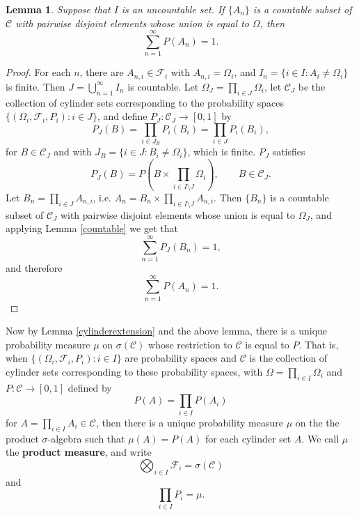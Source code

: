 \documentclass{article}
\newtheorem{lemma}[theorem]{Lemma}
\theoremstyle{definition}
\begin{document}
\begin{lemma}
Suppose that $I$ is an uncountable set. 
If $\{A_n\}$ is a countable subset of $\mathscr{C}$ with pairwise disjoint elements whose union is equal to $\Omega$, then
\[
\sum_{n=1}^\infty P(A_n)=1.
\]
\end{lemma}
\begin{proof}
For each $n$,
there are $A_{n,i} \in \mathscr{F}_i$ with $A_{n,i} = \Omega_i$, and
$I_n = \{i \in I: A_i \neq \Omega_i\}$ is finite. 
Then $J=\bigcup_{n=1}^\infty I_n$ is countable. Let $\Omega_J=\prod_{i \in J} \Omega_i$, let
$\mathscr{C}_J$ be the collection of cylinder sets corresponding to the probability
spaces $\{(\Omega_i,\mathscr{F}_i,P_i): i \in J\}$, and define $P_J:\mathscr{C}_J \to [0,1]$ by 
\[
P_J(B) = \prod_{i \in J_B} P_i(B_i) = \prod_{i \in J} P_i(B_i),
\]
for $B \in \mathscr{C}_J$ and with $J_B=\{i \in J: B_i \neq \Omega_i\}$, which is finite. $P_J$ satisfies
\[
P_J(B) = P\left(B \times \prod_{i \in I \setminus J} \Omega_i \right), \qquad B \in \mathscr{C}_J. 
\]
Let $B_n=\prod_{i \in J} A_{n,i}$,
i.e. $A_n = B_n \times \prod_{i \in I \setminus J} A_{n,i}$. 
 Then $\{B_n\}$ is a countable subset of $\mathscr{C}_J$ with pairwise disjoint elements whose
union is equal to $\Omega_J$, and
applying Lemma \ref{countable} we get that 
\[
\sum_{n=1}^\infty P_J(B_n)=1,
\]
and therefore
\[
\sum_{n=1}^\infty P(A_n) = 1.
\]
\end{proof}

Now by Lemma \ref{cylinderextension} and the above lemma, there is a unique probability measure $\mu$ on
$\sigma(\mathscr{C})$ whose restriction to $\mathscr{C}$ is equal to $P$. That is, 
when $\{(\Omega_i,\mathscr{F}_i,P_i): i \in I\}$ are probability spaces and
$\mathscr{C}$ is the collection of cylinder sets corresponding to these probability spaces, with
$\Omega=\prod_{i \in I} \Omega_i$ and $P:\mathscr{C} \to [0,1]$ defined by
\[
P(A) = \prod_{i \in I} P(A_i)
\]
for $A = \prod_{i \in I} A_i \in \mathscr{C}$, 
then there is a unique probability
measure $\mu$ on the the product $\sigma$-algebra such that
$\mu(A) = P(A)$ for each cylinder set $A$. We call
$\mu$ the \textbf{product measure}, and write 
\[
\bigotimes_{i \in I} \mathscr{F}_i = \sigma(\mathscr{C})
\]
and
\[
\prod_{i \in I} P_i
=
\mu. 
\]
\end{document}
